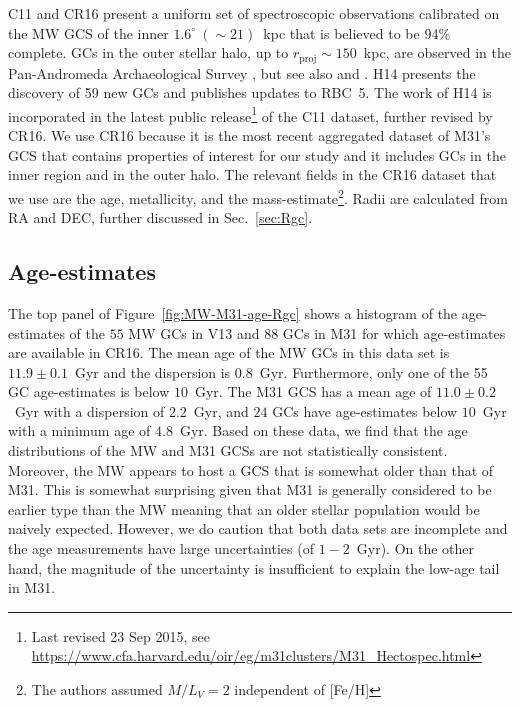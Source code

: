 \documentclass[a4paper,fleqn,usenatbib]{mnras}
\begin{document}
C11 and CR16 present a uniform set of spectroscopic observations calibrated
on the MW GCS of the inner $1.6^\circ~({\sim}21)$~kpc that
is believed to be 94\% complete. GCs in the outer stellar halo, up to
$r_{\text{proj}}\sim150$~kpc, are observed in the Pan-Andromeda Archaeological
Survey \citep[PAndAS, ][hereafter H14]{2014MNRAS.442.2165H}, but see also
\citet{2014MNRAS.442.2929V} and \citet{2019MNRAS.484.1756M}. H14 presents the
discovery of 59 new GCs and publishes updates to RBC~5. The work of H14 is
incorporated in the latest public release\footnote{Last revised 23 Sep 2015, see
\url{https://www.cfa.harvard.edu/oir/eg/m31clusters/M31_Hectospec.html}}
of the C11 dataset, further revised by CR16. We use CR16 because it is the most
recent aggregated dataset of M31's GCS that contains properties of interest
for our study and it includes GCs in the inner region and in the outer halo. The
relevant fields in the CR16 dataset that we use are the age, metallicity, and the
mass-estimate\footnote{The authors assumed $M/L_V = 2$ independent of [Fe/H]}.
Radii are calculated from RA and DEC, further discussed in Sec.~\ref{sec:Rgc}.

\subsection{Age-estimates}
The top panel of Figure~\ref{fig:MW-M31-age-Rgc} shows a histogram of the age-estimates
of the $55$ MW GCs in V13 and $88$ GCs in M31 for which age-estimates are available
in CR16. The mean age of the MW GCs in this data set is $11.9 \pm 0.1$~Gyr and the 
dispersion is $0.8$~Gyr. Furthermore, only one of the 55 GC age-estimates is
below $10$~Gyr. The M31 GCS has a mean age of $11.0 \pm 0.2$~Gyr with a dispersion 
of $2.2$~Gyr, and $24$ GCs have age-estimates below $10$~Gyr with a minimum age 
of $4.8$~Gyr. Based on these data, we find that the age distributions of the MW 
and M31 GCSs are not statistically consistent. Moreover, the MW appears 
to host a GCS that is somewhat older than that of M31.
This is somewhat surprising given that M31 is generally considered to be earlier
type than the MW meaning that an older stellar population would be naively expected.
However, we do caution that both data sets are incomplete and the age 
measurements have large uncertainties (of $1-2$~Gyr). On the other hand, the 
magnitude of the uncertainty is insufficient to explain the low-age tail in M31.
\end{document}
